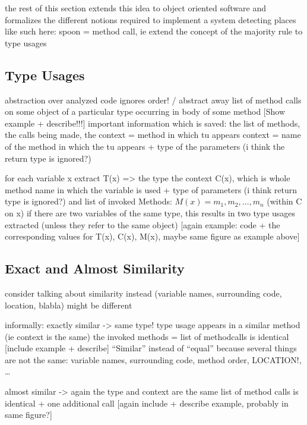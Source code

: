 the rest of this section extends this idea to object oriented software and formalizes the different notions required to implement a system detecting places like such
here: spoon = method call, ie extend the concept of the majority rule to type usages

\subsection{Type Usages}
abstraction over analyzed code
ignores order! / abstract away
list of method calls on some object of a particular type occurring in body of some method
[Show example + describe!!!]
important information which is saved: the list of methods, the calls being made, the context = method in which tu appears
context = name of the method in which the tu appears + type of the parameters (i think the return type is ignored?)

for each variable x
extract T(x) => the type
the context C(x), which is whole method name in which the variable is used + type of parameters (i think return type is ignored?)
and list of invoked Methods: $M(x) = {m_1, m_2, \dotsc, m_n}$ (within C on x)
if there are two variables of the same type, this results in two type usages extracted (unless they refer to the same object)
[again example: code + the corresponding values for T(x), C(x), M(x), maybe same figure as example above]

\subsection{Exact and Almost Similarity}

consider talking about similarity instead (variable names, surrounding code, location, blabla) might be different

informally:
exactly similar ->
    same type!
    type usage appears in a similar method (ie context is the same)
    the invoked methods = list of methodcalls is identical
[include example + describe]
``Similar'' instead of ``equal'' because several things are not the same:
variable names, surrounding code, method order, LOCATION!, \ldots

almost similar ->
    again the type and context are the same
    list of method calls is identical + one additional call
    [again include + describe example, probably in same figure?]

